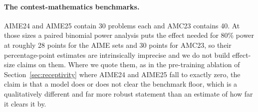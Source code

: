 

\paragraph{The contest-mathematics benchmarks.}
AIME24 and AIME25 contain 30 problems each and AMC23 contains 40. At those sizes a paired
binomial power analysis puts the effect needed for 80\% power at roughly 28 points for the
AIME sets and 30 points for AMC23, so their percentage-point estimates are intrinsically
imprecise and we do not build effect-size claims on them. Where we quote them, as in the
pre-training ablation of Section~\ref{sec:receptivity} where AIME24 and AIME25 fall to
exactly zero, the claim is that a model does or does not clear the benchmark floor, which
is a qualitatively different and far more robust statement than an estimate of how far it
clears it by.
